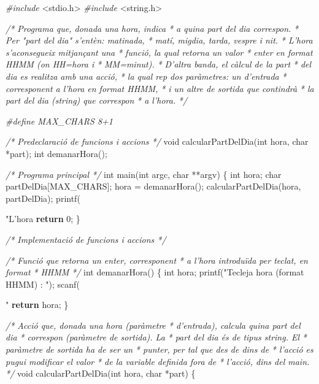 \documentclass[]{book}
\newenvironment{Shaded}{\begin{snugshade}}{\end{snugshade}}
\newcommand{\DataTypeTok}[1]{\textcolor[rgb]{0.13,0.29,0.53}{#1}}
\newcommand{\DecValTok}[1]{\textcolor[rgb]{0.00,0.00,0.81}{#1}}
\newcommand{\SpecialCharTok}[1]{\textcolor[rgb]{0.00,0.00,0.00}{#1}}
\newcommand{\StringTok}[1]{\textcolor[rgb]{0.31,0.60,0.02}{#1}}
\newcommand{\ImportTok}[1]{#1}
\newcommand{\CommentTok}[1]{\textcolor[rgb]{0.56,0.35,0.01}{\textit{#1}}}
\newcommand{\ControlFlowTok}[1]{\textcolor[rgb]{0.13,0.29,0.53}{\textbf{#1}}}
\newcommand{\PreprocessorTok}[1]{\textcolor[rgb]{0.56,0.35,0.01}{\textit{#1}}}
\newcommand{\NormalTok}[1]{#1}
\begin{document}
\begin{Shaded}
\begin{Highlighting}[]
\PreprocessorTok{#include }\ImportTok{<stdio.h>}
\PreprocessorTok{#include }\ImportTok{<string.h>}

\CommentTok{/* Programa que, donada una hora, indica}
\CommentTok{ * a quina part del dia correspon.}
\CommentTok{ * Per "part del dia" s'entèn: matinada,}
\CommentTok{ * matí, migdia, tarda, vespre i nit.}
\CommentTok{ * L'hora s'aconsegueix mitjançant una}
\CommentTok{ * funció, la qual retorna un valor}
\CommentTok{ * enter en format HHMM (on HH=hora i}
\CommentTok{ * MM=minut).}
\CommentTok{ * D'altra banda, el càlcul de la part}
\CommentTok{ * del dia es realitza amb una acció,}
\CommentTok{ * la qual rep dos paràmetres: un d'entrada}
\CommentTok{ * corresponent a l'hora en format HHMM, }
\CommentTok{ * i un altre de sortida que contindrà}
\CommentTok{ * la part del dia (string) que correspon}
\CommentTok{ * a l'hora.}
\CommentTok{ */}

\PreprocessorTok{#define MAX_CHARS 8+1}

\CommentTok{/* Predeclaració de funcions i accions */}
\DataTypeTok{void}\NormalTok{ calcularPartDelDia(}\DataTypeTok{int}\NormalTok{ hora, }\DataTypeTok{char}\NormalTok{ *part);}
\DataTypeTok{int}\NormalTok{ demanarHora();}

\CommentTok{/* Programa principal */}
\DataTypeTok{int}\NormalTok{ main(}\DataTypeTok{int}\NormalTok{ argc, }\DataTypeTok{char}\NormalTok{ **argv) \{}
    \DataTypeTok{int}\NormalTok{ hora;}
    \DataTypeTok{char}\NormalTok{ partDelDia[MAX_CHARS];}
\NormalTok{    hora = demanarHora();}
\NormalTok{    calcularPartDelDia(hora, partDelDia);}
\NormalTok{    printf(}\StringTok{"L'hora %
    \ControlFlowTok{return} \DecValTok{0}\NormalTok{;}
\NormalTok{\}}

\CommentTok{/* Implementació de funcions i accions */}

\CommentTok{/* Funció que retorna un enter, corresponent}
\CommentTok{ * a l'hora introduïda per teclat, en format}
\CommentTok{ * HHMM}
\CommentTok{ */}
\DataTypeTok{int}\NormalTok{ demanarHora() \{}
    \DataTypeTok{int}\NormalTok{ hora;}
\NormalTok{    printf(}\StringTok{"Tecleja hora (format HHMM) : "}\NormalTok{);}
\NormalTok{    scanf(}\StringTok{"%
    \ControlFlowTok{return}\NormalTok{ hora;}
\NormalTok{\}}

\CommentTok{/* Acció que, donada una hora (paràmetre}
\CommentTok{ * d'entrada), calcula quina part del dia}
\CommentTok{ * correspon (paràmetre de sortida). La}
\CommentTok{ * part del dia és de tipus string. El}
\CommentTok{ * paràmetre de sortida ha de ser un }
\CommentTok{ * punter, per tal que des de dins de}
\CommentTok{ * l'acció es pugui modificar el valor}
\CommentTok{ * de la variable definida fora de }
\CommentTok{ * l'acció, dins del main.}
\CommentTok{ */}
\DataTypeTok{void}\NormalTok{ calcularPartDelDia(}\DataTypeTok{int}\NormalTok{ hora, }\DataTypeTok{char}\NormalTok{ *part) \{}

}}
\end{Highlighting}
\end{Shaded}
\end{document}

